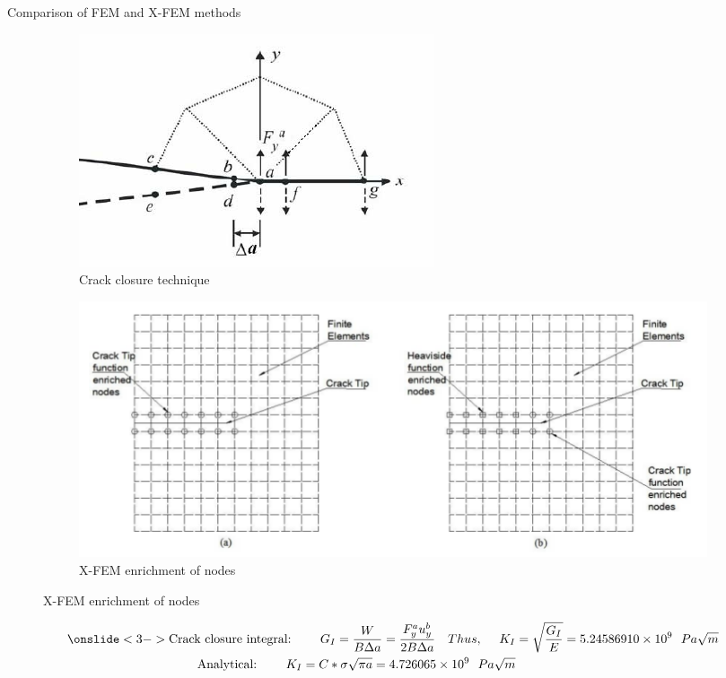\documentclass{beamer}
\begin{document}
\begin{frame}[t,fragile]{Comparison of FEM and X-FEM methods}
    \vspace{-.7cm}
    \hspace{15pt}
       \begin{figure}[H]
    \begin{subfigure}{0.45\textwidth}
    \centering
    \includegraphics[scale=.2]{crackclosure.png}
    \caption{\tiny Crack closure technique}
\end{subfigure}
        \hspace{15pt}
       \begin{subfigure}{0.45\textwidth}
    \centering
      \includegraphics[scale=.15]{k.png}
    \caption{\tiny X-FEM enrichment of nodes}
\end{subfigure}
\end{figure}
\vspace{-12pt}
    \tiny {}  
\begin{align*}
    \onslide<3->  \text{Crack closure integral:}\ \ \ \ \ \ \ G_I=\frac{W}{B\Delta a}=\frac{F_{y}^au_{y}^b}{2B \Delta a}\ \ \ Thus, \ \ \ \
    K_I&=\sqrt{\frac{G_I}{E}}=5.24586910\times 10^9\ \ Pa\sqrt{m}\\ 
   \text{Analytical:}\ \ \ \ \ \ \ K_I=C*\sigma\sqrt{\pi a}=4.726065 \times 10^9\ \ Pa\sqrt{m}\\

\end{align*}
\end{frame}
\end{document}
